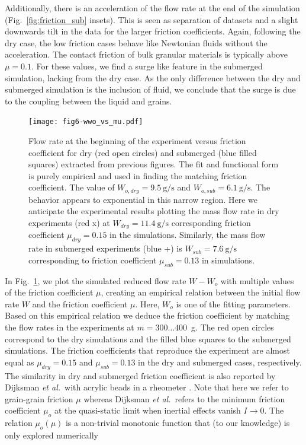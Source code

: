 \documentclass[twoside,twocolumn,9pt]{article}
\begin{document}
Additionally, there is an acceleration of the flow rate at the end of the simulation (Fig.~\ref{fig:friction_sub} insets). This is seen as separation of datasets and a slight downwards tilt in the data for the larger friction coefficients. Again, following the dry case, the low friction cases behave like Newtonian fluids without the acceleration. The contact friction of bulk granular materials is typically above $\mu=0.1$. For these values, we find a surge like feature in the submerged simulation, lacking from the dry case. As the only difference between the dry and submerged simulation is the inclusion of fluid, we conclude that the surge is due to the coupling between the liquid and grains.
%
\begin{figure}[!t]
\texttt{[image: fig6-wwo\_vs\_mu.pdf]}
\caption{Flow rate at the beginning of the experiment versus friction coefficient for dry (red open circles) and submerged (blue filled squares) extracted from previous figures. The fit and functional form is purely empirical and used in finding the matching friction coefficient. The value of $W_{o,dry} = 9.5~\mathrm{g/s}$ and $W_{o,sub} = 6.1~\mathrm{g/s}$. The behavior appears to exponential in this narrow region. Here we anticipate the experimental results plotting the mass flow rate in dry experiments (red x) at $W_{dry} = 11.4~\mathrm{g/s}$ corresponding friction coefficient $\mu_{dry}=0.15$ in the simulations. Similarly, the mass flow rate in submerged experiments (blue +) is $W_{sub}=7.6~\mathrm{g/s}$ corresponding to friction coefficient $\mu_{sub} = 0.13$ in simulations.}\label{fig:q_vs_mu}
\end{figure}
%
In Fig.~\ref{fig:q_vs_mu}, we plot the simulated reduced flow rate $W-W_o$ with multiple values of the friction coefficient $\mu$, creating an empirical relation between the initial flow rate $W$ and the friction coefficient $\mu$. Here, $W_o$ is one of the fitting parameters. Based on this empirical relation we deduce the friction coefficient by matching the flow rates in the experiments at $m=300\ldots 400$~g. The red open circles correspond to the dry simulations  and the filled blue squares to the submerged simulations. The friction coefficients that reproduce the experiment are almost equal as $\mu_{dry}=0.15$ and $\mu_{sub}=0.13$ in the dry and submerged cases, respectively. The similarity in dry and submerged friction coefficient is also reported by Dijksman {\it et al.}~with acrylic beads in a rheometer \cite{DijksmanPRE10}. Note that here we refer to grain-grain friction $\mu$ whereas Dijksman {\it et al.}~refers to the  minimum friction coefficient $\mu_o$ at the quasi-static limit when inertial effects vanish $I\to 0$. The relation $\mu_o(\mu)$ is a non-trivial monotonic function that (to our knowledge) is only explored numerically \cite{Lemaitre09RHA,DaCruz05PRE,Trulsson16PRE} %
\end{document}
